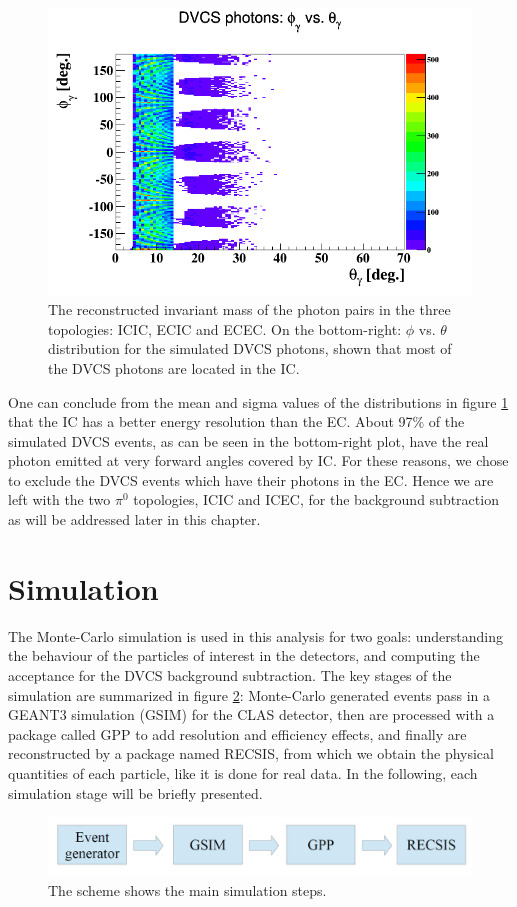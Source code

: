\begin{figure}[tbp]
\hspace{-0.2in}
\includegraphics[scale=0.38]{fig_analysis/sim_photon_phi_theta_2.png}
\caption{The reconstructed invariant mass of the photon pairs in the three topologies: ICIC, ECIC and ECEC. On the bottom-right: $\phi$ vs. $\theta$ distribution for the simulated DVCS photons, shown that most of the DVCS photons are located in the IC.} 
\label{fig:pi0_selection}
\end{figure}

One can conclude from the mean and sigma values of the distributions in figure \ref{fig:pi0_selection} that the IC has a better energy resolution than the EC. About 97$\%$ of the simulated DVCS events, as can be seen in the bottom-right plot, have the real photon emitted at very forward angles covered by IC. For these reasons, we chose to exclude the DVCS events which have their photons in the EC. Hence we are left with the two $\pi^{0}$ topologies, ICIC and ICEC, for the background subtraction as will be addressed later in this chapter.


\section{Simulation}
The Monte-Carlo simulation is used in this analysis for two goals: understanding the behaviour of the particles of interest in the detectors, and computing the acceptance for the DVCS background subtraction. The key stages of the simulation are summarized in figure \ref{fig:simulation_steps}: Monte-Carlo generated events pass in a GEANT3 simulation (GSIM) for the CLAS detector, then are processed with a package called GPP to add resolution and efficiency effects, and finally are reconstructed by a package named RECSIS, from which we obtain the physical quantities of each particle, like it is done for real data. In the following, each simulation stage will be briefly presented.
\begin{figure}[tbp]
\centering
\includegraphics[scale=0.25]{fig_simulation/simulation_steps.png}
\caption{ The scheme shows the main simulation steps.} 
\label{fig:simulation_steps}
\end{figure}

